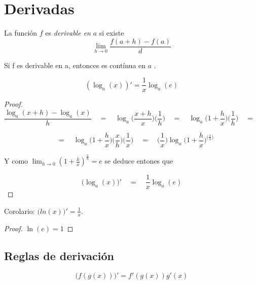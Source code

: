 \documentclass[14pt,a4paper]{extarticle}
\begin{document}
\section{Derivadas}

\begin{mydef}[Derivable en \( a \) ]
La funci\'on \( f \) es \emph{derivable en} \( a \)  si existe
\[ \lim_{h \to 0} \frac{f(a+h)-f(a)}{d} \]
\end{mydef}

\begin{theorem}
Si f es derivable en a, entonces es cont\'inua en \( a \) .
\end{theorem}

\begin{theorem}
\[ (\log_a(x))' = \frac{1}{x}\log_a(e) \]
\end{theorem}
\begin{proof}

\[ \frac{\log_a(x+h)-\log_a(x)}{h} \quad = \quad
\log_a\Big(\frac{x+h}{x}\Big)\Big(\frac{1}{h}\Big) \quad = \quad
\log_a\Big(1+\frac{h}{x}\Big)\Big(\frac{1}{h}\Big) \quad = \quad
 \]


\[  \quad = \quad \log_a\Big(1+\frac{h}{x}\Big)\Big(\frac{x}{h}\Big)\Big(\frac{1}{x}\Big)
 \quad = \quad
 \Big(\frac{1}{x}\Big)\log_a\Big(1+\frac{h}{x}\Big)^{\Big(\frac{x}{h}\Big)} \]

Y como \( \lim_{h \to 0}(1+\frac{h}{x})^{\frac{x}{h}}  =  e \) se
deduce entones que


\[ \Big(\log_a(x)\Big)' \quad = \quad \frac{1}{x} \log_a(e) \]
\end{proof}
Corolario: \( \Big( ln(x) \Big)' = \frac{1}{x}.  \)
\begin{proof}
\( \ln(e)=1 \)
\end{proof}

\subsection{Reglas de derivaci\'on}

\begin{theorem}
\begin{equation}
\Big(f(g(x))\Big)' = f'(g(x))g'(x)
\end{equation}
\end{theorem}
\end{document}
